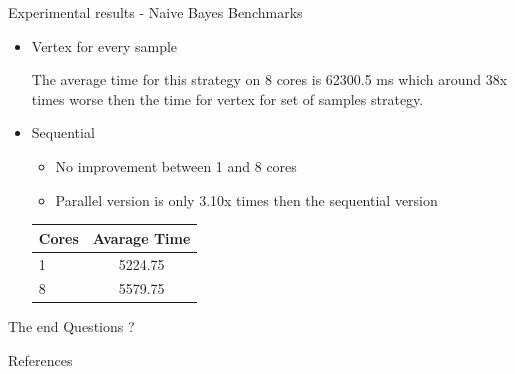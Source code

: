 \documentclass{beamer}
\begin{document}
\begin{frame}{Experimental results -  Naive Bayes Benchmarks}

\begin{itemize}

\item{Vertex for every sample}

The average time for this strategy on 8 cores is 62300.5 ms which around 38x times worse then the time for vertex for set of samples strategy.

\item{Sequential}

\begin{itemize}
\item No improvement between 1 and 8 cores
\item Parallel version is only 3.10x times then the sequential version
\end{itemize}

\begin{table}[!htb]
\centering
\begin{tabular}{ l c }
    \hline\hline
    Cores & Avarage Time \\ [0.2ex]
    \hline
    1 & 5224.75 \\
    8 & 5579.75  \\
    \hline
  \end{tabular}
\label{table:naivebayes2}
\end{table}

\end{itemize}

\end{frame}


\begin{frame}{The end}
Questions ?
\end{frame}

\begin{frame}[allowframebreaks]{References}


\end{frame}
\end{document}
